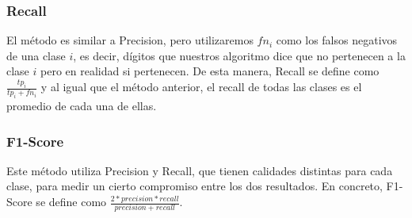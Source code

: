 \subsubsection{Recall}

El m\'etodo es similar a Precision, pero utilizaremos $fn_i$ como los falsos negativos de una clase $i$, es decir, d\'igitos que nuestros algoritmo dice que no pertenecen a la clase $i$ pero en realidad si pertenecen. De esta manera, Recall se define como $\frac{tp_i}{tp_i+fn_i}$ y al igual que el m\'etodo anterior, el recall de todas las clases es el promedio de cada una de ellas.

\subsubsection{F1-Score}

Este m\'etodo utiliza Precision y Recall, que tienen calidades distintas para cada clase, para medir un cierto compromiso entre los dos resultados. En concreto, F1-Score se define como $\frac{2 * precision * recall}{precision + recall}$.